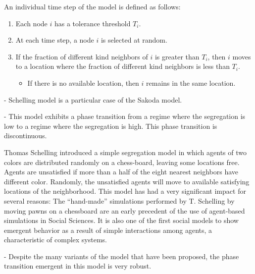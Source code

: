 \begin{theorem}
    An individual time step of the model is defined as follows:
    \begin{enumerate}
        \item Each node $i$ has a tolerance threshold $T_i$.
        \item At each time step, a node $i$ is selected at random.
        \item If the fraction of different kind neighbors of $i$ is greater than $T_i$, then $i$ moves to a location where the fraction of different kind neighbors is less than $T_i$.
            \begin{itemize}
                \item If there is no available location, then $i$ remains in the same location.
            \end{itemize}
    \end{enumerate}
\end{theorem}

- Schelling model is a particular case of the Sakoda model.

- This model exhibits a phase transition from a regime where the segregation is low to a regime where the segregation is high. This phase transition is discontinuous. 

Thomas Schelling introduced a simple segregation model   \cite{schelling-1969,Schelling,schellingbook,hegselmann-2017} in which agents of two colors are distributed randomly on a chess-board, leaving some locations free. Agents are unsatisfied if more than a half of the eight nearest neighbors have different color. Randomly, the unsatisfied agents will move to available satisfying locations of the neighborhood. This model has had a very significant impact for several reasons: The ``hand-made'' simulations performed by T. Schelling by moving pawns on a chessboard are an early precedent of the use of  agent-based simulations in Social Sciences. It is also one of the first social models to show emergent behavior as a result of simple interactions among agents, a characteristic of complex systems.

- Despite the many variants of the model that have been proposed, the phase transition emergent in this model is very robust.

